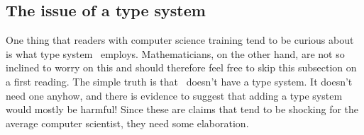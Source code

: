 \documentclass{mtmtcl}
\theoremstyle{plain}
\theoremstyle{remark}
\begin{document}
%     
%     
%   
%     
% 
% 
% 
% 
% 

\subsection{The issue of a type system}

One thing that readers with computer science training tend to be 
curious about is what type system \mtl\ employs. Mathematicians, on 
the other hand, are not so inclined to worry on this and should 
therefore feel free to skip this subsection on a first reading. 
The simple truth is that \mtl\ doesn't have a type system. It doesn't 
need one anyhow, and there is evidence to suggest that adding a type 
system would mostly be harmful! Since these are claims that tend to be 
shocking for the average computer scientist, they need some 
elaboration.
\end{document}
